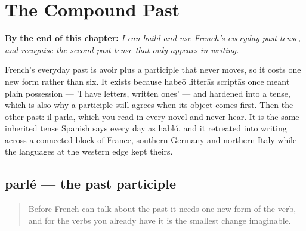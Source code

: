 
\chapter{The Compound Past}
\label{ch:passe-compose}

\begin{chapteropening}
\textbf{By the end of this chapter:} \emph{I can build and use French's everyday past tense, and recognise the second past tense that only appears in writing.}

French's everyday past is avoir plus a participle that never moves, so it costs one new form rather than six. It exists because habeō litterās scriptās once meant plain possession — 'I have letters, written ones' — and hardened into a tense, which is also why a participle still agrees when its object comes first. Then the other past: il parla, which you read in every novel and never hear. It is the same inherited tense Spanish says every day as habló, and it retreated into writing across a connected block of France, southern Germany and northern Italy while the languages at the western edge kept theirs.
\end{chapteropening}

\section[parlé]{parlé — the past participle}

\label{lesson:FR-C15-participe-er}



\begin{quote}
Before French can talk about the past it needs one new form of the verb, and for the verbs you already have it is the smallest change imaginable.
\end{quote}

